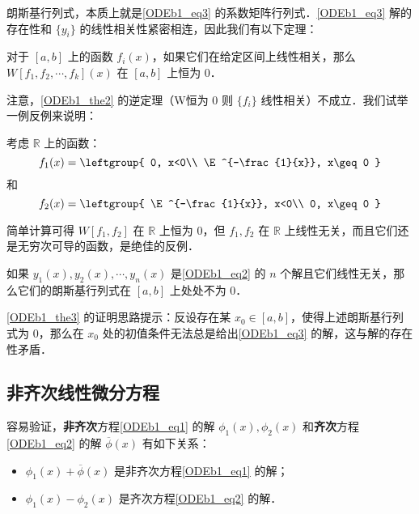 朗斯基行列式，本质上就是\autoref{ODEb1_eq3} 的系数矩阵行列式．\autoref{ODEb1_eq3} 解的存在性和 $\{y_i\}$ 的线性相关性紧密相连，因此我们有以下定理：




\begin{theorem}{}\label{ODEb1_the2}
对于 $[a, b]$ 上的函数 $f_i(x)$，如果它们在给定区间上线性相关，那么 $W[f_1, f_2, \cdots, f_k](x)$ 在 $[a, b]$ 上恒为 $0$．
\end{theorem}

注意，\autoref{ODEb1_the2} 的逆定理（W恒为 $0$ 则 $\{f_i\}$ 线性相关）不成立．我们试举一例反例来说明：

\begin{example}{}
考虑 $\mathbb{R}$ 上的函数：
\begin{equation}
f_1(x)=\leftgroup{
    0, x<0\\
    \E^{-\frac{1}{x}}, x\geq 0
}
\end{equation}
和
\begin{equation}
f_2(x)=\leftgroup{
    \E^{-\frac{1}{x}}, x<0\\
    0, x\geq 0
}
\end{equation}

简单计算可得 $W[f_1, f_2]$ 在 $\mathbb{R}$ 上恒为 $0$，但 $f_1, f_2$ 在 $\mathbb{R}$ 上线性无关，而且它们还是无穷次可导的函数，是绝佳的反例．




\end{example}

\begin{theorem}{}\label{ODEb1_the3}
如果 $y_1(x), y_2(x), \cdots, y_n(x)$ 是\autoref{ODEb1_eq2} 的 $n$ 个解且它们线性无关，那么它们的朗斯基行列式在 $[a, b]$ 上处处不为 $0$．
\end{theorem}

\autoref{ODEb1_the3} 的证明思路提示：反设存在某 $x_0\in[a, b]$，使得上述朗斯基行列式为 $0$，那么在 $x_0$ 处的初值条件无法总是给出\autoref{ODEb1_eq3} 的解，这与解的存在性矛盾．




\subsection{非齐次线性微分方程}

容易验证，\textbf{非齐次}方程\autoref{ODEb1_eq1} 的解 ${\phi}_1(x), \phi_2(x)$ 和\textbf{齐次}方程\autoref{ODEb1_eq2} 的解 $\overline{\phi}(x)$ 有如下关系：
\begin{itemize}
\item $\phi_1(x)+\overline{\phi}(x)$ 是非齐次方程\autoref{ODEb1_eq1} 的解；
\item $\phi_1(x)-\phi_2(x)$ 是齐次方程\autoref{ODEb1_eq2} 的解．
\end{itemize}

